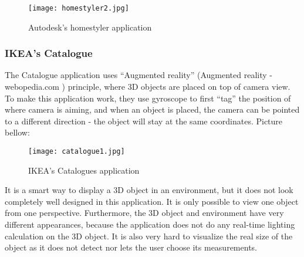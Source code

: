 \begin{figure}[H]
\centering
\texttt{[image: homestyler2.jpg]}
\caption{Autodesk's homestyler application}
\end{figure}

\subsubsection{IKEA’s Catalogue}

The Catalogue application uses “Augmented reality” (Augmented reality - webopedia.com ) principle, where 3D objects are placed on top of camera view. To make this application work, they use gyroscope to first “tag” the position of where camera is aiming, and when an object is placed, the camera can be pointed to a different direction - the object will stay at the same coordinates. Picture bellow:

\begin{figure}[H]
\centering
\texttt{[image: catalogue1.jpg]}
\caption{IKEA's Catalogues application}
\end{figure}

It is a smart way to display a 3D object in an environment, but it does not look completely well designed in this application. It is only possible to view one object from one perspective. Furthermore, the 3D object and environment have very different appearances, because the application does not do any real-time lighting calculation on the 3D object. It is also very hard to visualize the real size of the object as it does not detect nor lets the user choose its measurements.